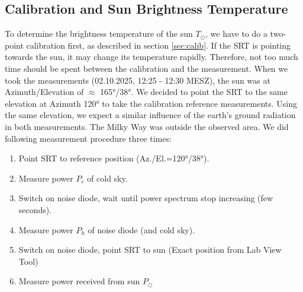 \subsection{Calibration and Sun Brightness Temperature}
To determine the brightness temperature of the sun $T_\odot$, we have to do a two-point calibration first, as described in section \ref{sec:calib}. 
If the SRT is pointing towards the sun, it may change its temperature rapidly. Therefore, not too much time should be spent between the calibration and the measurement. 
When we took the measurements (02.10.2025, 12:25 - 12:30 MESZ), the sun was at Azimuth/Elevation of $\approx$ 165°/38°. 
We decided to point the SRT to the same elevation at Azimuth 120° to take the calibration reference measurements. Using the same elevation, we expect a similar influence of the earth's ground radiation in both measurements. 
The Milky Way was outside the observed area. We did following measurement procedure three times:

\begin{enumerate}
	\item Point SRT to reference position (Az./El.=120°/38°).
	\item Measure power $P_c$ of cold sky.
	\item Switch on noise diode, wait until power spectrum stop increasing (few seconds).
	\item Measure power $P_h$ of noise diode (and cold sky).
	\item Switch on noise diode, point SRT to sun (Exact position from Lab View Tool)
	\item Measure power received from sun $P_\odot$
\end{enumerate}


